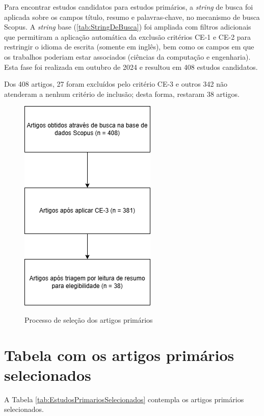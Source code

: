 \documentclass[
	12pt,				%
	oneside,			%
	a4paper,			%
	english,			%
	brazil				%
	]{abntex2ppgsi}
\begin{document}
\begin{apendicesenv}
Para encontrar estudos candidatos para estudos primários, a \textit{string} de busca foi aplicada sobre os campos título, resumo e palavras-chave, no mecanismo de busca Scopus. A \textit{string} base (\ref{tab:StringDeBusca}) foi ampliada com filtros adicionais que permitiram a aplicação automática da exclusão critérios CE-1 e CE-2 para restringir o idioma de escrita (somente em inglês), bem como os campos em que os trabalhos poderiam estar associados (ciências da computação e engenharia). Esta fase foi realizada em outubro de 2024 e resultou em 408 estudos candidatos.

Dos 408 artigos, 27 foram excluídos pelo critério CE-3 e outros 342 não atenderam a nenhum critério de inclusão; desta forma, restaram 38 artigos.

\begin{figure}[htbp]
	\centering
	\caption{Processo de seleção dos artigos primários}
		\includegraphics[width=.3\linewidth]{images/seleção-dos-artigos-primários.png}
	\label{fig:seleção-dos-artigos-primários}
\end{figure}

\section{Tabela com os artigos primários selecionados}\label{section:tabela-com-os-artigos-primarios-selecionados}

A Tabela \ref{tab:EstudosPrimariosSelecionados} contempla os artigos primários selecionados.


\end{apendicesenv}
\end{document}
